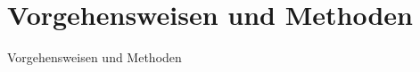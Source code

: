 \chapter{Vorgehensweisen und Methoden}
\label{VorgehensweisenUndMethoden}
Vorgehensweisen und Methoden